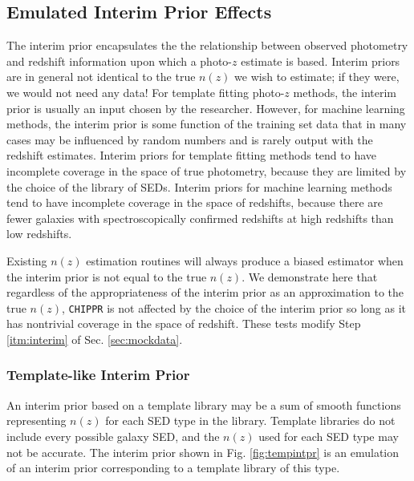 \documentclass[iop]{emulateapj}
\newcommand{\chippr}{\texttt{CHIPPR} }
\begin{document}
\subsection{Emulated Interim Prior Effects}
\label{sec:priors}

The interim prior encapsulates the the relationship between observed photometry 
and redshift information upon which a photo-$z$ estimate is based.  Interim 
priors are in general not identical to the true $n(z)$ we wish to estimate; if 
they were, we would not need any data!  For template fitting photo-$z$ methods, 
the interim prior is usually an input chosen by the researcher.  However, for 
machine learning methods, the interim prior is some function of the training 
set data that in many cases may be influenced by random numbers and is rarely 
output with the redshift estimates.  Interim priors for template fitting 
methods tend to have incomplete coverage in the space of true photometry, 
because they are limited by the choice of the library of SEDs.  Interim priors 
for machine learning methods tend to have incomplete coverage in the space of 
redshifts, because there are fewer galaxies with spectroscopically confirmed 
redshifts at high redshifts than low redshifts.

Existing $n(z)$ estimation routines will always produce a biased estimator when 
the interim prior is not equal to the true $n(z)$.  We demonstrate here that 
regardless of the appropriateness of the interim prior as an approximation to 
the true $n(z)$, \chippr is not affected by the choice of the interim prior so 
long as it has nontrivial coverage in the space of redshift.  These tests 
modify Step \ref{itm:interim} of Sec. \ref{sec:mockdata}.

\subsubsection{Template-like Interim Prior}
\label{sec:tempintpr}

An interim prior based on a template library may be a sum of smooth functions 
representing $n(z)$ for each SED type in the library.  Template libraries do 
not include every possible galaxy SED, and the $n(z)$ used for each SED type 
may not be accurate.  The interim prior shown in Fig. \ref{fig:tempintpr} is an 
emulation of an interim prior corresponding to a template library of this type.
\end{document}
